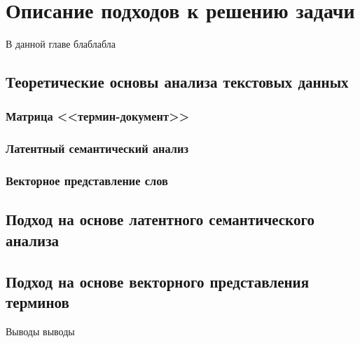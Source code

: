 \chapter{Описание подходов к решению задачи}

В данной главе блаблабла

\section{Теоретические основы анализа текстовых данных}

\subsection{Матрица <<термин-документ>>}

\subsection{Латентный семантический анализ}
\label{ssec:latent_semantic_analysis}

\subsection{Векторное представление слов}

\section{Подход на основе латентного семантического анализа}

\section{Подход на основе векторного представления терминов}

\chapterconclusion

Выводы выводы
